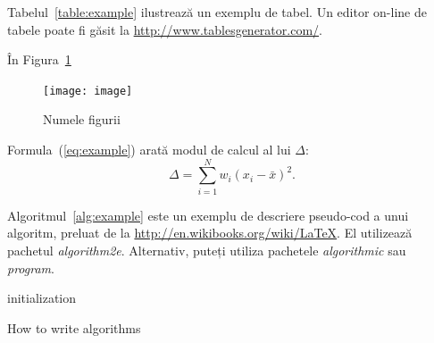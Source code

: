 Tabelul~\ref{table:example} ilustrează un exemplu de tabel. Un editor on-line de tabele poate fi găsit la \url{http://www.tablesgenerator.com/}. 


În Figura~\ref{fig:exemplu} 

\begin{figure}
    \centering
    \texttt{[image: image]}
    \caption{Numele figurii}
    \label{fig:exemplu}
\end{figure}


Formula~(\ref{eq:example}) arată modul de calcul al lui $\Delta$:
\begin{equation} \label{eq:example}
    \Delta =\sum_{i=1}^N w_i (x_i - \bar{x})^2 .
\end{equation}


Algoritmul~\ref{alg:example} este un exemplu de descriere pseudo-cod a unui algoritm, preluat de la \href{http://en.wikibooks.org/wiki/LaTeX/Algorithms#Typesetting_using_the_algorithm2e_package}{http://en.wikibooks.org/wiki/LaTeX}. El utilizează pachetul \textit{algorithm2e}. Alternativ, puteți utiliza pachetele \textit{algorithmic} sau \textit{program}. 

\begin{algorithm}
 initialization\;
 \caption{How to write algorithms}
 \label{alg:example}
\end{algorithm}
